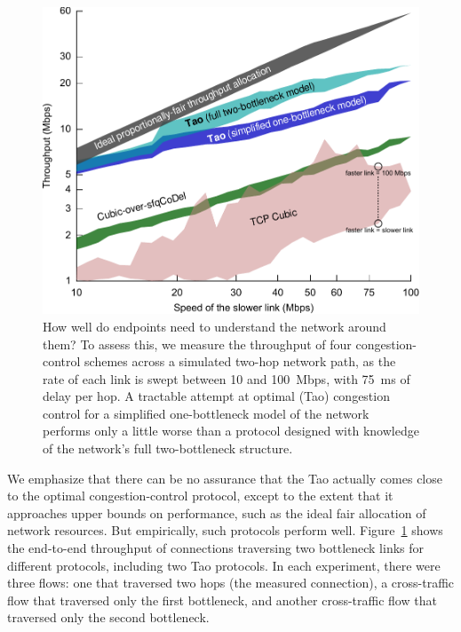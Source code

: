 \begin{figure}[t!]
\includegraphics[width=\columnwidth]{figures/plots-10x-new-multilink/multilink-crossing-manual.pdf}
\caption{How well do endpoints need to understand the network around
  them? To assess this, we measure the throughput of four
  congestion-control schemes across a simulated two-hop network path,
  as the rate of each link is swept between 10 and 100~Mbps, with
  75~ms of delay per hop. A tractable attempt at optimal (Tao)
  congestion control for a simplified one-bottleneck model of the
  network performs only a little worse than a protocol designed with
  knowledge of the network's full two-bottleneck structure.}
\label{f:multihop}
\end{figure}

We emphasize that there can be no assurance that the Tao actually
comes close to the optimal congestion-control protocol, except to the
extent that it approaches upper bounds on performance, such as the
ideal fair allocation of network resources. But empirically, such
protocols perform well. Figure~\ref{f:multihop} shows the end-to-end
throughput of connections traversing two bottleneck links for
different protocols, including two Tao protocols. In each experiment,
there were three flows: one that traversed two hops (the measured
connection), a cross-traffic flow that traversed only the first
bottleneck, and another cross-traffic flow that traversed only the
second bottleneck.


